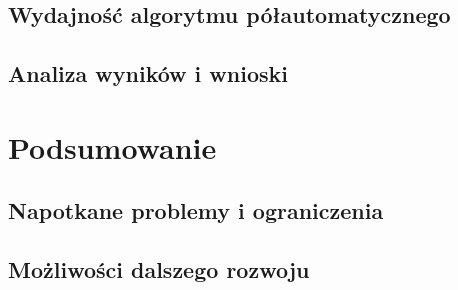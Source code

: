 \documentclass[a4paper,11pt,twoside]{report}
\theoremstyle{definition}
\begin{document}
\section {Wydajność algorytmu półautomatycznego}

\section {Analiza wyników i wnioski}


\chapter {Podsumowanie}

\section {Napotkane problemy i ograniczenia}

\section {Możliwości dalszego rozwoju}







\end{document}

